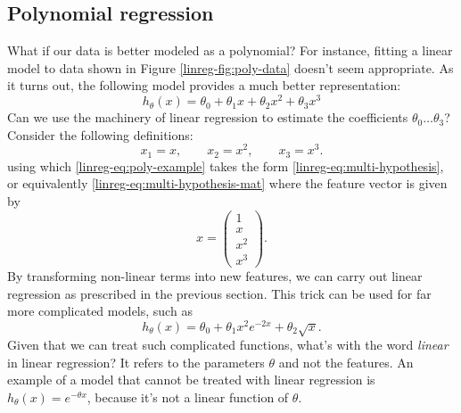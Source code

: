 \documentclass{article}
\theoremstyle{definition}
\begin{document}
\subsection{Polynomial regression}
What if our data is better modeled as a polynomial? For instance, fitting a linear model to data shown in Figure \ref{linreg-fig:poly-data} doesn't seem appropriate. As it turns out, the following model provides a much better representation:
\begin{equation}
h_\theta(x) = \theta_0 + \theta_1 x + \theta_2 x^2 + \theta_3 x^3
\label{linreg-eq:poly-example}
\end{equation}
Can we use the machinery of linear regression to estimate the coefficients $\theta_0\dots\theta_3$? Consider the following definitions:
\begin{equation}
    x_1 = x, \qquad x_2 = x^2, \qquad x_3 = x^3.
\end{equation}
using which \eqref{linreg-eq:poly-example} takes the form \eqref{linreg-eq:multi-hypothesis}, or equivalently \eqref{linreg-eq:multi-hypothesis-mat} where the feature vector is given by
\begin{equation}
    x=
    \begin{pmatrix}
        1 \\
        x \\
        x^2 \\
        x^3
    \end{pmatrix}.
\end{equation}
By transforming non-linear terms into new features, we can carry out linear regression as prescribed in the previous section. This trick can be used for far more complicated models, such as
\begin{equation}
    h_{\theta}(x) = \theta_0 + \theta_1 x^2 e^{-2x} + \theta_2 \sqrt{x}.
\end{equation}
Given that we can treat such complicated functions, what's with the word \textit{linear} in linear regression? It refers to the parameters $\theta$ and not the features. An example of a model that cannot be treated with linear regression is $h_{\theta}(x) = e^{-\theta x}$, because it's not a linear function of $\theta$.
\end{document}
